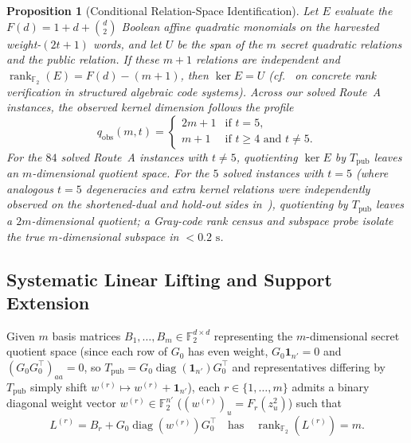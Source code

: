 \documentclass[11pt,a4paper]{article}
\newtheorem{proposition}{Proposition}
\theoremstyle{definition}
\theoremstyle{remark}
\newcommand{\F}{\mathbb{F}}
\newcommand{\rk}{\operatorname{rank}}
\newcommand{\diag}{\operatorname{diag}}
\begin{document}
\begin{proposition}[Conditional Relation-Space Identification]
\label{prop:quotient-dim}
Let $E$ evaluate the $F(d) = 1 + d + \binom{d}{2}$ Boolean affine quadratic monomials on the harvested weight-$(2t+1)$ words, and let $U$ be the span of the $m$ secret quadratic relations and the public relation. If these $m + 1$ relations are independent and $\rk_{\F_2}(E) = F(d) - (m + 1)$, then $\ker E = U$ (cf.~\cite{CMSU25} on concrete rank verification in structured algebraic code systems). Across our solved Route~A instances, the observed kernel dimension follows the profile
\begin{equation}
\label{eq:quotient-dim}
    q_{\mathrm{obs}}(m, t) =
    \begin{cases}
        2m + 1 & \text{if } t = 5, \\
        m + 1  & \text{if } t \ge 4 \text{ and } t \neq 5.
    \end{cases}
\end{equation}
For the $84$ solved Route~A instances with $t \neq 5$, quotienting $\ker E$ by $T_{\text{pub}}$ leaves an $m$-dimensional quotient space. For the $5$ solved instances with $t = 5$ (where analogous $t = 5$ degeneracies and extra kernel relations were independently observed on the shortened-dual and hold-out sides in~\cite{BLT26,Wei26}), quotienting by $T_{\text{pub}}$ leaves a $2m$-dimensional quotient; a Gray-code rank census and subspace probe isolate the true $m$-dimensional subspace in $< 0.2\text{ s}$.
\end{proposition}

\subsection{Systematic Linear Lifting and Support Extension}
\label{subsec:linear-lift}

Given $m$ basis matrices $B_1, \dots, B_m \in \F_2^{d \times d}$ representing the $m$-dimensional secret quotient space (since each row of $G_0$ has even weight, $G_0 \mathbf{1}_{n'} = 0$ and $(G_0 G_0^\top)_{aa} = 0$, so $T_{\text{pub}} = G_0 \diag(\mathbf{1}_{n'}) G_0^\top$ and representatives differing by $T_{\text{pub}}$ simply shift $w^{(r)} \mapsto w^{(r)} + \mathbf{1}_{n'}$), each $r \in \{1, \dots, m\}$ admits a binary diagonal weight vector $w^{(r)} \in \F_2^{n'}$ ($(w^{(r)})_u = F_r(z_u^2)$) such that
\begin{equation}
\label{eq:minrank-raw}
    L^{(r)} = B_r + G_0 \diag(w^{(r)}) G_0^\top \quad \text{has} \quad \rk_{\F_2}(L^{(r)}) = m.
\end{equation}
\end{document}
